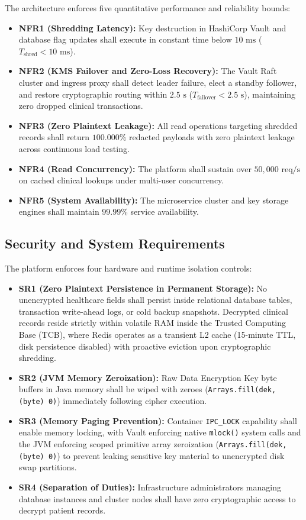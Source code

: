 The architecture enforces five quantitative performance and reliability bounds:
\begin{itemize}
    \item \textbf{NFR1 (Shredding Latency):} Key destruction in HashiCorp Vault and database flag updates shall execute in constant time below $10\text{~ms}$ ($T_{\text{shred}} < 10\text{~ms}$).
    \item \textbf{NFR2 (KMS Failover and Zero-Loss Recovery):} The Vault Raft cluster and ingress proxy shall detect leader failure, elect a standby follower, and restore cryptographic routing within $2.5\text{~s}$ ($T_{\text{failover}} < 2.5\text{~s}$), maintaining zero dropped clinical transactions.
    \item \textbf{NFR3 (Zero Plaintext Leakage):} All read operations targeting shredded records shall return $100.000\%$ redacted payloads with zero plaintext leakage across continuous load testing.
    \item \textbf{NFR4 (Read Concurrency):} The platform shall sustain over $50{,}000\text{~req/s}$ on cached clinical lookups under multi-user concurrency.
    \item \textbf{NFR5 (System Availability):} The microservice cluster and key storage engines shall maintain $99.99\%$ service availability.
\end{itemize}

\subsection{Security and System Requirements}

The platform enforces four hardware and runtime isolation controls:
\begin{itemize}
    \item \textbf{SR1 (Zero Plaintext Persistence in Permanent Storage):} No unencrypted healthcare fields shall persist inside relational database tables, transaction write-ahead logs, or cold backup snapshots. Decrypted clinical records reside strictly within volatile RAM inside the Trusted Computing Base (TCB), where Redis operates as a transient L2 cache (15-minute TTL, disk persistence disabled) with proactive eviction upon cryptographic shredding.
    \item \textbf{SR2 (JVM Memory Zeroization):} Raw Data Encryption Key byte buffers in Java memory shall be wiped with zeroes (\texttt{Arrays.fill(dek, (byte) 0)}) immediately following cipher execution.
    \item \textbf{SR3 (Memory Paging Prevention):} Container \texttt{IPC\_LOCK} capability shall enable memory locking, with Vault enforcing native \texttt{mlock()} system calls and the JVM enforcing scoped primitive array zeroization (\texttt{Arrays.fill(dek, (byte) 0)}) to prevent leaking sensitive key material to unencrypted disk swap partitions.
    \item \textbf{SR4 (Separation of Duties):} Infrastructure administrators managing database instances and cluster nodes shall have zero cryptographic access to decrypt patient records.
\end{itemize}

